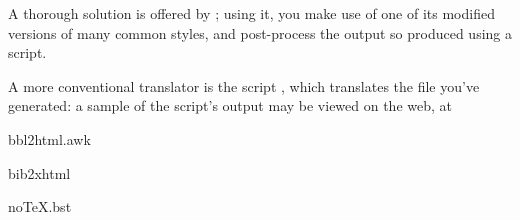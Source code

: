 A thorough solution is offered by ; using it, you
make use of one of its modified versions of many common \BibTeX{}
styles, and post-process the output so produced using a
 script.

A more conventional translator is the  script
, which translates the  file you've generated:
a sample of the script's output may be viewed on the web, at
\begin{ctanrefs}
\item[bbl2html.awk]
\item[bib2xhtml]
\item[noTeX.bst]
\end{ctanrefs}

